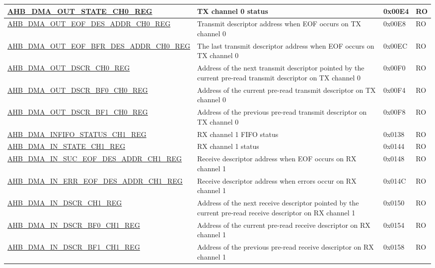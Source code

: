 \begin{longtable}{ | p{8cm} | p{8cm} | p{1.3cm} | p{1.5cm} | }
\hyperref[regdesc:AHBDMAOUTSTATECHNREG]{AHB\_DMA\_OUT\_STATE\_CH0\_REG} & TX channel 0 status & 0x00E4 & RO \\ \hline
\hyperref[regdesc:AHBDMAOUTEOFDESADDRCHNREG]{AHB\_DMA\_OUT\_EOF\_DES\_ADDR\_CH0\_REG} & Transmit descriptor address when EOF occurs on TX channel 0 & 0x00E8 & RO \\ \hline
\hyperref[regdesc:AHBDMAOUTEOFBFRDESADDRCHNREG]{AHB\_DMA\_OUT\_EOF\_BFR\_DES\_ADDR\_CH0\_REG} & The last transmit descriptor address when EOF occurs on TX channel 0 & 0x00EC & RO \\ \hline
\hyperref[regdesc:AHBDMAOUTDSCRCHNREG]{AHB\_DMA\_OUT\_DSCR\_CH0\_REG} & Address of the next transmit descriptor pointed by the current pre-read transmit descriptor on TX channel 0 & 0x00F0 & RO \\ \hline
\hyperref[regdesc:AHBDMAOUTDSCRBF0CHNREG]{AHB\_DMA\_OUT\_DSCR\_BF0\_CH0\_REG} & Address of the current pre-read transmit descriptor on TX channel 0 & 0x00F4 & RO \\ \hline
\hyperref[regdesc:AHBDMAOUTDSCRBF1CHNREG]{AHB\_DMA\_OUT\_DSCR\_BF1\_CH0\_REG} & Address of the previous pre-read transmit descriptor on TX channel 0 & 0x00F8 & RO \\ \hline
\hyperref[regdesc:AHBDMAINFIFOSTATUSCHNREG]{AHB\_DMA\_INFIFO\_STATUS\_CH1\_REG} & RX channel 1 FIFO status & 0x0138 & RO \\ \hline
\hyperref[regdesc:AHBDMAINSTATECHNREG]{AHB\_DMA\_IN\_STATE\_CH1\_REG} & RX channel 1 status & 0x0144 & RO \\ \hline
\hyperref[regdesc:AHBDMAINSUCEOFDESADDRCHNREG]{AHB\_DMA\_IN\_SUC\_EOF\_DES\_ADDR\_CH1\_REG} & Receive descriptor address when EOF occurs on RX channel 1 & 0x0148 & RO \\ \hline
\hyperref[regdesc:AHBDMAINERREOFDESADDRCHNREG]{AHB\_DMA\_IN\_ERR\_EOF\_DES\_ADDR\_CH1\_REG} & Receive descriptor address when errors occur on RX channel 1 & 0x014C & RO \\ \hline
\hyperref[regdesc:AHBDMAINDSCRCHNREG]{AHB\_DMA\_IN\_DSCR\_CH1\_REG} & Address of the next receive descriptor pointed by the current pre-read receive descriptor on RX channel 1 & 0x0150 & RO \\ \hline
\hyperref[regdesc:AHBDMAINDSCRBF0CHNREG]{AHB\_DMA\_IN\_DSCR\_BF0\_CH1\_REG} & Address of the current pre-read receive descriptor on RX channel 1 & 0x0154 & RO \\ \hline
\hyperref[regdesc:AHBDMAINDSCRBF1CHNREG]{AHB\_DMA\_IN\_DSCR\_BF1\_CH1\_REG} & Address of the previous pre-read receive descriptor on RX channel 1 & 0x0158 & RO \\ \hline

\end{longtable}
